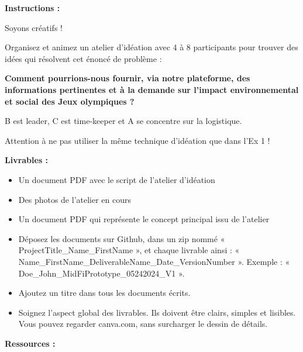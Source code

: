 \makeheaderfiles

\textbf{Instructions :}

Soyons créatifs !

Organisez et animez un atelier d'idéation avec 4 à 8 participants pour trouver des idées qui résolvent cet énoncé de problème :

\textbf{Comment pourrions-nous fournir, via notre plateforme, des informations pertinentes et à la demande sur l'impact environnemental et social des Jeux olympiques ?}

B est leader, C est time-keeper et A se concentre sur la logistique.

Attention à ne pas utiliser la même technique d'idéation que dans l'Ex 1 !

\textbf{Livrables :}

\begin{itemize}
\item Un document PDF avec le script de l'atelier d'idéation
\item Des photos de l'atelier en cours
\item Un document PDF qui représente le concept principal issu de l'atelier
\item Déposez les documents sur Github, dans un zip nommé « ProjectTitle\_Name\_FirstName », et chaque livrable ainsi : « Name\_FirstName\_DeliverableName\_Date\_VersionNumber ». Exemple : « Doe\_John\_MidFiPrototype\_05242024\_V1 ».
\item Ajoutez un titre dans tous les documents écrits.
\item Soignez l'aspect global des livrables. Ils doivent être clairs, simples et lisibles. Vous pouvez regarder canva.com, sans surcharger le dessin de détails.
\end{itemize}

\textbf{Ressources :}


